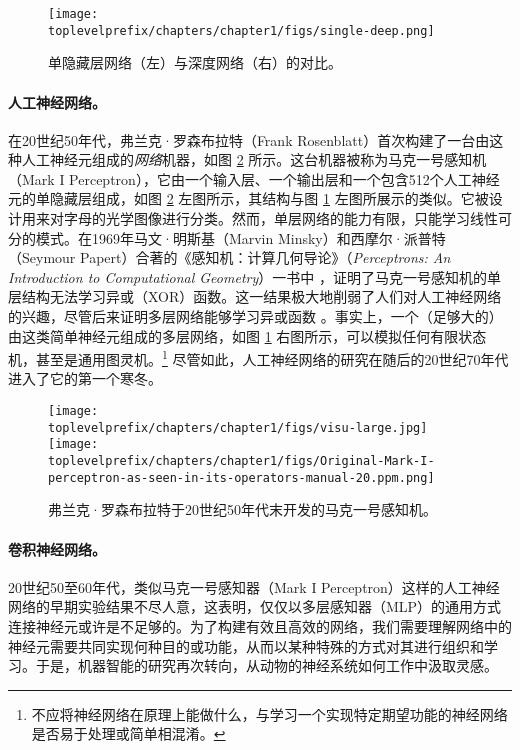 \documentclass[../../book-main_zh.tex]{subfiles}
\begin{document}
\begin{figure}[t]
\centering
\texttt{[image: \\toplevelprefix/chapters/chapter1/figs/single-deep.png]}
    \caption{单隐藏层网络（左）与深度网络（右）的对比。}
    \label{fig:single-deep}
\end{figure}
\paragraph{人工神经网络。}
在20世纪50年代，弗兰克·罗森布拉特（Frank Rosenblatt）首次构建了一台由这种人工神经元组成的{\em 网络}机器，如图 \ref{fig:perceptron} 所示。这台机器被称为马克一号感知机（Mark I Perceptron），它由一个输入层、一个输出层和一个包含512个人工神经元的单隐藏层组成，如图 \ref{fig:perceptron} 左图所示，其结构与图 \ref{fig:single-deep} 左图所展示的类似。它被设计用来对字母的光学图像进行分类。然而，单层网络的能力有限，只能学习线性可分的模式。在1969年马文·明斯基（Marvin Minsky）和西摩尔·派普特（Seymour Papert）合著的《感知机：计算几何导论》（{\em Perceptrons: An Introduction to Computational Geometry}）一书中 \cite{Minsky-1969}，证明了马克一号感知机的单层结构无法学习异或（XOR）函数。这一结果极大地削弱了人们对人工神经网络的兴趣，尽管后来证明多层网络能够学习异或函数 \cite{Rumelhart1986}。事实上，一个（足够大的）由这类简单神经元组成的多层网络，如图 \ref{fig:single-deep} 右图所示，可以模拟任何有限状态机，甚至是通用图灵机。\footnote{不应将神经网络在原理上能做什么，与学习一个实现特定期望功能的神经网络是否易于处理或简单相混淆。} 尽管如此，人工神经网络的研究在随后的20世纪70年代进入了它的第一个寒冬。

\begin{figure}
    \centering
    \texttt{[image: \\toplevelprefix/chapters/chapter1/figs/visu-large.jpg]}
    \hspace{2mm} \texttt{[image: \\toplevelprefix/chapters/chapter1/figs/Original-Mark-I-perceptron-as-seen-in-its-operators-manual-20.ppm.png]}
    \caption{弗兰克·罗森布拉特于20世纪50年代末开发的马克一号感知机。}
    \label{fig:perceptron}
\end{figure}


\paragraph{卷积神经网络。}

20世纪50至60年代，类似马克一号感知器（Mark I Perceptron）这样的人工神经网络的早期实验结果不尽人意，这表明，仅仅以多层感知器（MLP）的通用方式连接神经元或许是不足够的。为了构建有效且高效的网络，我们需要理解网络中的神经元需要共同实现何种目的或功能，从而以某种特殊的方式对其进行组织和学习。于是，机器智能的研究再次转向，从动物的神经系统如何工作中汲取灵感。
\end{document}
